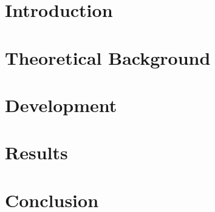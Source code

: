 \documentclass[12pt]{report}
\begin{document}
\clearpage
{} %


\chapter{Introduction}
\label{chap:Introduction}


\chapter{Theoretical Background}
\label{chap:BasicPrin}
%

\label{chap:StateArt}
%


\chapter{Development}
\label{chap:Develop}


\chapter{Results}
\label{chap:Result}


\chapter{Conclusion}
\label{chap:Conclusion}




%

\clearpage


\printbibliography

\end{document}
